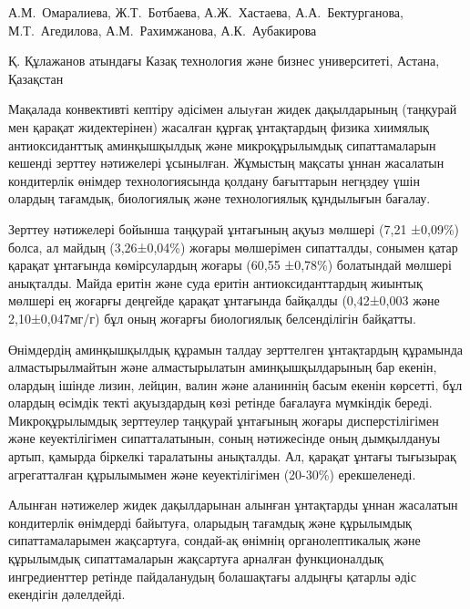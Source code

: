 \vspace{2em}
\begin{header}

А.М.~Омаралиева,
Ж.Т.~Ботбаева\envelope,
А.Ж.~Хастаева,
А.А.~Бектурганова,
М.Т.~Агедилова,
А.М.~Рахимжанова,
А.К.~Аубакирова
\end{header}

\begin{affil}
Қ. Құлажанов атындағы Казақ технология және бизнес университеті, Астана, Қазақстан

\end{affil}

Мақалада конвективті кептіру әдісімен алыyған жидек дақылдарының
(таңқурай мен қарақат жидектерінен) жасалған құрғақ ұнтақтардың физика
хиимялық антиоксиданттық аминқышқылдық және микроқұрылымдық
сипаттамаларын кешенді зерттеу нәтижелері ұсынылған. Жұмыстың мақсаты
ұннан жасалатын кондитерлік өнімдер технологиясында қолдану бағыттарын
негңздеу үшін олардың тағамдық, биологиялық және технологиялық
құндылығын бағалау.

Зерттеу нәтижелері бойынша таңқурай ұнтағының ақуыз мөлшері (7,21
±0,09\%) болса, ал майдың (3,26±0,04\%) жоғары мөлшерімен сипатталды,
сонымен қатар қарақат ұнтағында көмірсулардың жоғары (60,55 ±0,78\%)
болатындай мөлшері анықталды. Майда еритін және суда еритін
антиоксиданттардың жиынтық мөлшері ең жоғарғы деңгейде қарақат ұнтағында
байқалды (0,42±0,003 және 2,10±0,047мг/г) бұл оның жоғарғы биологиялық
белсенділігін байқатты.

Өнімдердің аминқышқылдық құрамын талдау зерттелген ұнтақтардың құрамында
алмастырылмайтын және алмастырылатын аминқышқылдарының бар екенін,
олардың ішінде лизин, лейцин, валин және аланиннің басым екенін
көрсетті, бұл олардың өсімдік текті ақуыздардың көзі ретінде бағалауға
мүмкіндік береді. Микроқұрылымдық зерттеулер таңқурай ұнтағының жоғары
дисперстілігімен және кеуектілігімен сипатталатынын, соның нәтижесінде
оның дымқылдануы артып, қамырда біркелкі таралатыны анықталды. Ал,
қарақат ұнтағы тығызырақ агрегатталған құрылымымен және кеуектілігімен
(20-30\%) ерекшеленеді.

Алынған нәтижелер жидек дақылдарынан алынған ұнтақтарды ұннан жасалатын
кондитерлік өнімдерді байытуға, оларыдың тағамдық және құрылымдық
сипаттамаларымен жақсартуға, сондай-ақ өнімнің органолептикалық және
құрылымдық сипаттамаларын жақсартуға арналған функционалдық
ингредиенттер ретінде пайдаланудың болашақтағы алдыңғы қатарлы әдіс
екендігін дәлелдейді.

